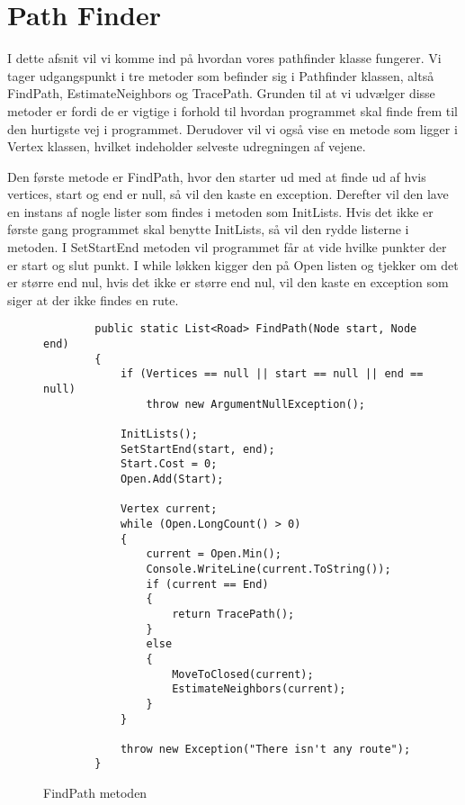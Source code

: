 \section{Path Finder}\label{PathFinder}
I dette afsnit vil vi komme ind på hvordan vores pathfinder klasse fungerer. Vi tager udgangspunkt i tre metoder som befinder sig i Pathfinder klassen, altså FindPath, EstimateNeighbors og TracePath. Grunden til at vi udvælger disse metoder er fordi de er vigtige i forhold til hvordan programmet skal finde frem til den hurtigste vej i programmet. Derudover vil vi også vise en metode som ligger i Vertex klassen, hvilket indeholder selveste udregningen af vejene. 

\vspace{5mm}

Den første metode er FindPath, hvor den starter ud med at finde ud af hvis vertices, start og end er null, så vil den kaste en exception. Derefter vil den lave en instans af nogle lister som findes i metoden som InitLists. Hvis det ikke er første gang programmet skal benytte InitLists, så vil den rydde listerne i metoden. I SetStartEnd metoden vil programmet får at vide hvilke punkter der er start og slut punkt. I while løkken kigger den på Open listen og tjekker om det er større end nul, hvis det ikke er større end nul, vil den kaste en exception som siger at der ikke findes en rute.

\begin{figure}[H]
\begin{lstlisting}
		public static List<Road> FindPath(Node start, Node end)
        {
            if (Vertices == null || start == null || end == null)
                throw new ArgumentNullException();

            InitLists();
            SetStartEnd(start, end);
            Start.Cost = 0;
            Open.Add(Start);

            Vertex current;
            while (Open.LongCount() > 0)
            {
                current = Open.Min();
                Console.WriteLine(current.ToString());
                if (current == End)
                {
                    return TracePath();
                } 
                else
                {
                    MoveToClosed(current);
                    EstimateNeighbors(current);
                }
            }

            throw new Exception("There isn't any route");
        }
\end{lstlisting}
\caption{FindPath metoden}\label{FindPathCode}
\end{figure}


